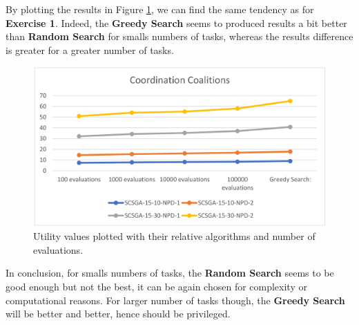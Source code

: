 \documentclass[10pt]{article}
\begin{document}
 By plotting the results in Figure \ref{fig:scsga_graph}, we can find the same tendency
  as for \textbf{Exercise 1}. Indeed, the \textbf{Greedy Search} seems to produced results
  a bit better than \textbf{Random Search} for smalls numbers of tasks, whereas the results
  difference is greater for a greater number of tasks.

 \begin{figure}[ht!]
 \includegraphics[width=\linewidth]{scsga_graph.png}
 \caption{Utility values plotted with their relative algorithms and number of evaluations.}
 \label{fig:scsga_graph}
 \end{figure}

In conclusion, for smalls numbers of tasks, the \textbf{Random Search} seems to be good
 enough but not the best, it can be again chosen for complexity or computational reasons.
 For larger number of tasks though, the \textbf{Greedy Search} will be better and better,
 hence should be privileged.   
\end{document}
